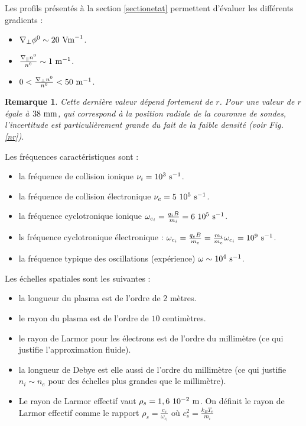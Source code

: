 \documentclass{book}
\newtheorem{rem}{Remarque}[chapter]
\begin{document}
Les profils pr\'esent\'es \`a la section \ref{sectionetat} permettent
d'\'evaluer les diff\'erents gradients :
\begin{itemize}
\item $\nabla_\perp\phi^0\sim 20\ {\rm Vm}^{-1}$.
\item $\frac{\nabla_\parallel n^0}{n^0}\sim 1\ {\rm m}^{-1}$.
\item $0< {\frac{\nabla_\perp n^0}{n^0}}   <50\ {\rm m}^{-1}$.
\end{itemize}
\begin{rem}
Cette derni\`ere valeur d\'epend fortement de $r$. Pour une valeur de
$r$ \'egale \`a $38\ {\rm mm}$, qui correspond \`a la position radiale
de la couronne de sondes, l'incertitude est particuli\`erement grande
du fait de la faible densit\'e (voir Fig.\ref{nr}).
\end{rem}

Les fr\'equences caract\'eristiques sont :

\begin{itemize}
\item la fr\'equence de collision ionique $\nu_i=10^{3}\ {\rm s}^{-1}$.
\item  la fr\'equence de collision \'electronique $\nu_e=5\ 10^{5}\ {\rm s}^{-1}$.
\item la fr\'equence cyclotronique ionique
$\omega_{c_i}=\frac{q_iB}{m_i}=6\ 10^{5}\ {\rm s}^{-1}$.
\item ls fr\'equence cyclotronique \'electronique :
$\omega_{c_i}=\frac{q_e B}{m_e}=\frac{m_i}{m_e}\omega_{c_i}=10^{9}\ {\rm
s}^{-1}$.
\item la fr\'equence typique des oscillations (exp\'erience) $\omega\sim
10^{4}\ {\rm s}^{-1}$. 
\end{itemize}


Les \'echelles spatiales sont les suivantes :
\begin{itemize}
\item la longueur du plasma est de l'ordre de 2 m\`etres. 
\item le rayon du plasma est de l'ordre de $10$ centim\`etres.
\item le rayon de Larmor pour les \'electrons est de l'ordre du
millim\`etre (ce qui justifie l'approximation fluide).
\item la longueur de Debye est elle aussi de l'ordre du millim\`etre
(ce qui justifie $n_i\sim n_e$ pour des \'echelles plus grandes que le
millim\`etre). 
\item Le rayon de Larmor effectif  vaut $\rho_s=1,6\ 10^{-2}\ {\rm m}$.
On d\'efinit le rayon de Larmor effectif comme le rapport
$\rho_s=\frac{c_s}{\omega_{c_i}}$
o\`u $c_s^2=\frac{k_B T_e}{m_i}$
\end{itemize}
\end{document}
